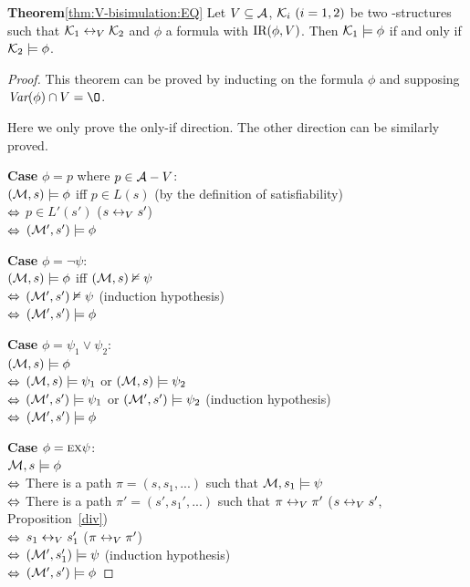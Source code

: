 \documentclass[letterpaper]{article} %
\begin{document}
\noindent\textbf{Theorem}\ref{thm:V-bisimulation:EQ}
Let $V\subseteq\cal A$, ${\cal K}_i~(i=1,2)$ be two \MPK-structures such that
  ${\cal K}_1\leftrightarrow_V{\cal K}_2$ and $\phi$ a formula with $\textrm{IR}(\phi,V)$. Then
  ${\cal K}_1\models\phi$ if and only if ${\cal K}_2\models\phi$.\\
\begin{proof}
This theorem can be proved by inducting on the formula $\phi$ and supposing $\Var(\phi) \cap V = \O$.

Here we only prove the only-if direction. The other direction can be similarly proved.

\textbf{Case} $\phi = p$ where $p \in {\cal A} - V$:\\
$({\cal M}, s) \models \phi$ iff $p\in L(s)$  \hfill  (by the definition of satisfiability) \\
$\Leftrightarrow$ $p \in L'(s')$ \hfill ($s \leftrightarrow_V s'$)\\
$\Leftrightarrow$ $({\cal M}', s') \models \phi$

\textbf{Case} $\phi = \neg \psi$:\\
$({\cal M}, s) \models \phi$ iff $({\cal M}, s) \nvDash \psi$ \\
$\Leftrightarrow$ $({\cal M}', s') \nvDash \psi$  \hfill   (induction hypothesis)\\
$\Leftrightarrow$ $({\cal M}', s') \models \phi$

\textbf{Case} $\phi = \psi_1 \vee \psi_2$:\\
$({\cal M}, s) \models \phi$\\
$\Leftrightarrow$ $({\cal M}, s) \models \psi_1$ or $({\cal M}, s) \models \psi_2$\\
$\Leftrightarrow$ $({\cal M}', s') \models \psi_1$ or $({\cal M}', s') \models \psi_2$   \hfill  (induction hypothesis)\\
$\Leftrightarrow$ $({\cal M}', s') \models \phi$

\textbf{Case} $\phi = \textsc{e} \textsc{x} \psi$:\\
${\cal M}, s \models \phi$ \\
$\Leftrightarrow$ There is a path $\pi = (s, s_1, ...)$ such that ${\cal M}, s_1 \models \psi$\\
$\Leftrightarrow$ There is a path $\pi' = (s', s_1', ...)$ such that $\pi \leftrightarrow_V \pi'$ \hfill   ($s \leftrightarrow_V s'$, Proposition~\ref{div})\\
$\Leftrightarrow$ $s_1 \leftrightarrow_V s_1'$  \hfill ($\pi \leftrightarrow_V \pi'$)\\
$\Leftrightarrow$ $({\cal M}', s_1') \models \psi$  \hfill  (induction hypothesis)\\
$\Leftrightarrow$ $({\cal M}', s') \models \phi$


\end{proof}
\end{document}
